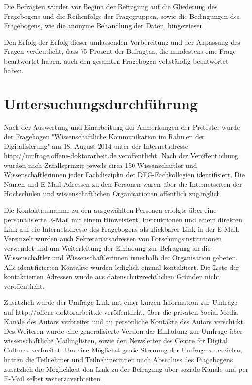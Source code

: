 Die Befragten wurden vor Beginn der Befragung auf die Gliederung des Fragebogens und die Reihenfolge der Fragegruppen, sowie die Bedingungen des Fragebogens, wie die anonyme Behandlung der Daten, hingewiesen.

Den Erfolg der Erfolg dieser umfassenden Vorbereitung und der Anpassung des Fragen verdeutlicht, dass 75 Prozent der Befragten, die mindestens eine Frage beantwortet haben, auch den gesamten Fragebogen vollständig beantwortet haben.

\section{Untersuchungsdurchführung}

Nach der Auswertung und Einarbeitung der Anmerkungen der Pretester wurde der Fragebogen "Wissenschaftliche Kommunikation im Rahmen der Digitalisierung" am 18. August 2014 unter der Internetadresse http://umfrage.offene-doktorarbeit.de veröffentlicht. Nach der Veröffentlichung wurden nach Zufallsprinzip jeweils circa 150 Wissenschaftler und Wissenschaftlerinnen jeder Fachdisziplin der DFG-Fachkollegien \cite{DFG_2014} identifiziert. Die Namen und E-Mail-Adressen zu den Personen waren über die Internetseiten der Hochschulen und wissenschaftlichen Organisationen öffentlich zugänglich.

Die Kontaktaufnahme zu den ausgewählten Personen erfolgte über eine personalisierte E-Mail mit einem Hinweistext, Instruktionen und einem direkten Link auf die Internetadresse des Fragebogens als klickbarer Link in der E-Mail. Vereinzelt wurden auch Sekretariatsadressen von Forschungsinstitutionen verwendet und um Weiterleitung der Einladung zur Befragung an die Wissenschaftler und Wissenschaftlerinnen innerhalb der Organisation gebeten. Alle identifizierten Kontakte wurden lediglich einmal kontaktiert. Die Liste der kontaktierten Adressen wurde aus datenschutzrechtlichen Gründen nicht veröffentlicht.

Zusätzlich wurde der Umfrage-Link mit einer kurzen Information zur Umfrage auf http://offene-doktorarbeit.de veröffentlicht, über die privaten Social-Media Kanäle des Autors verbreitet und an persönliche Kontakte des Autors verschickt. Des Weiteren wurde eine generalisierte Version der Einladung zur Umfrage über wissenschaftliche Mailinglisten, sowie den Newsletter des Centre for Digital Cultures verbreitet. Um eine Möglichst große Streuung der Umfrage zu erzielen, hatten die Teilnehmer und Teilnehmerinnen nach Abschluss des Fragebogens zusätzlich die Möglichkeit den Link zu der Befragung über soziale Kanäle und per E-Mail selbst weiterzuverbreiten.

